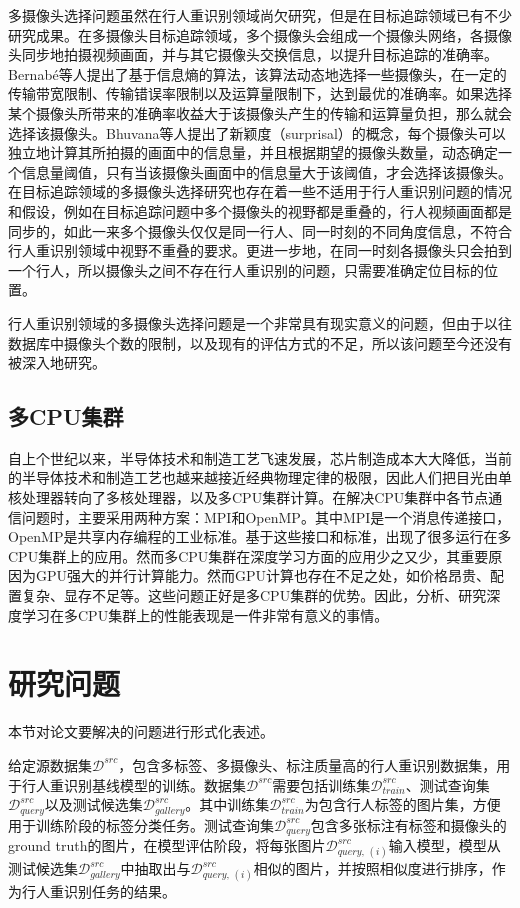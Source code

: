 多摄像头选择问题虽然在行人重识别领域尚欠研究，但是在目标追踪领域已有不少研究成果。在多摄像头目标追踪领域，多个摄像头会组成一个摄像头网络，各摄像头同步地拍摄视频画面，并与其它摄像头交换信息，以提升目标追踪的准确率。Bernab{\'e}等人\cite{de2012entropy}提出了基于信息熵的算法，该算法动态地选择一些摄像头，在一定的传输带宽限制、传输错误率限制以及运算量限制下，达到最优的准确率。如果选择某个摄像头所带来的准确率收益大于该摄像头产生的传输和运算量负担，那么就会选择该摄像头。Bhuvana等人\cite{bhuvana2016multi}提出了新颖度（surprisal）的概念，每个摄像头可以独立地计算其所拍摄的画面中的信息量，并且根据期望的摄像头数量，动态确定一个信息量阈值，只有当该摄像头画面中的信息量大于该阈值，才会选择该摄像头。在目标追踪领域的多摄像头选择研究也存在着一些不适用于行人重识别问题的情况和假设，例如在目标追踪问题中多个摄像头的视野都是重叠的，行人视频画面都是同步的，如此一来多个摄像头仅仅是同一行人、同一时刻的不同角度信息，不符合行人重识别领域中视野不重叠的要求。更进一步地，在同一时刻各摄像头只会拍到一个行人，所以摄像头之间不存在行人重识别的问题，只需要准确定位目标的位置。

行人重识别领域的多摄像头选择问题是一个非常具有现实意义的问题，但由于以往数据库中摄像头个数的限制，以及现有的评估方式的不足，所以该问题至今还没有被深入地研究。

\subsection{多CPU集群}

自上个世纪以来，半导体技术和制造工艺飞速发展，芯片制造成本大大降低，当前的半导体技术和制造工艺也越来越接近经典物理定律的极限，因此人们把目光由单核处理器转向了多核处理器，以及多CPU集群计算。在解决CPU集群中各节点通信问题时，主要采用两种方案：MPI\cite{sur2006high}和OpenMP\cite{dagum1998openmp}。其中MPI是一个消息传递接口，OpenMP是共享内存编程的工业标准。基于这些接口和标准，出现了很多运行在多CPU集群上的应用\cite{rabenseifner2009hybrid,ayguade2009design}。然而多CPU集群在深度学习方面的应用少之又少，其重要原因为GPU强大的并行计算能力。然而GPU计算也存在不足之处，如价格昂贵、配置复杂、显存不足等。这些问题正好是多CPU集群的优势。因此，分析、研究深度学习在多CPU集群上的性能表现是一件非常有意义的事情。

\section{研究问题}

本节对论文要解决的问题进行形式化表述。

给定源数据集$\mathcal{D}^{src}$，包含多标签、多摄像头、标注质量高的行人重识别数据集，用于行人重识别基线模型的训练。数据集$\mathcal{D}^{src}$需要包括训练集$\mathcal{D}_{train}^{src}$、测试查询集$\mathcal{D}_{query}^{src}$以及测试候选集$\mathcal{D}_{gallery}^{src}$。其中训练集$\mathcal{D}_{train}^{src}$为包含行人标签的图片集，方便用于训练阶段的标签分类任务。测试查询集$\mathcal{D}_{query}^{src}$包含多张标注有标签和摄像头的ground truth的图片，在模型评估阶段，将每张图片$\mathcal{D}_{query,\,(i)}^{src}$输入模型，模型从测试候选集$\mathcal{D}_{gallery}^{src}$中抽取出与$\mathcal{D}_{query,\,(i)}^{src}$相似的图片，并按照相似度进行排序，作为行人重识别任务的结果。

